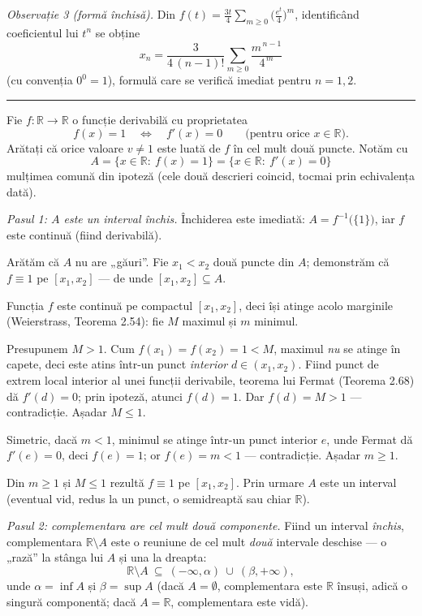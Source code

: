 \emph{Observație 3 (formă închisă).} Din $f(t)=\frac{3t}{4}\sum_{m\ge0}\bigl(\frac{e^{t}}{4}\bigr)^{m}$, identificând coeficientul lui $t^n$ se obține
\[ x_n=\frac{3}{4\,(n-1)!}\sum_{m\ge0}\frac{m^{\,n-1}}{4^{\,m}} \]
(cu convenția $0^0=1$), formulă care se verifică imediat pentru $n=1,2$.
\vspace{1mm}\hrule

Fie $f:\mathbb{R}\to\mathbb{R}$ o funcție derivabilă cu proprietatea
\[ f(x)=1\quad\Longleftrightarrow\quad f'(x)=0\qquad\text{(pentru orice }x\in\mathbb{R}\text{)} . \]
Arătați că orice valoare $v\neq1$ este luată de $f$ în cel mult două puncte.
\sol Notăm cu
\[ A=\{x\in\mathbb{R}:\ f(x)=1\}=\{x\in\mathbb{R}:\ f'(x)=0\} \]
mulțimea comună din ipoteză (cele două descrieri coincid, tocmai prin echivalența dată).

\emph{Pasul 1: $A$ este un interval închis.} Închiderea este imediată: $A=f^{-1}\bigl(\{1\}\bigr)$, iar $f$ este continuă (fiind derivabilă).

Arătăm că $A$ nu are „găuri''. Fie $x_{1}<x_{2}$ două puncte din $A$; demonstrăm că $f\equiv1$ pe $[x_{1},x_{2}]$ --- de unde $[x_{1},x_{2}]\subseteq A$.

Funcția $f$ este continuă pe compactul $[x_{1},x_{2}]$, deci își atinge acolo marginile (Weierstrass, Teorema 2.54): fie $M$ maximul și $m$ minimul.

Presupunem $M>1$. Cum $f(x_{1})=f(x_{2})=1<M$, maximul \emph{nu} se atinge în capete, deci este atins într-un punct \emph{interior} $d\in(x_{1},x_{2})$. Fiind punct de extrem local interior al unei funcții derivabile, teorema lui Fermat (Teorema 2.68) dă $f'(d)=0$; prin ipoteză, atunci $f(d)=1$. Dar $f(d)=M>1$ --- contradicție. Așadar $M\le1$.

Simetric, dacă $m<1$, minimul se atinge într-un punct interior $e$, unde Fermat dă $f'(e)=0$, deci $f(e)=1$; or $f(e)=m<1$ --- contradicție. Așadar $m\ge1$.

Din $m\ge1$ și $M\le1$ rezultă $f\equiv1$ pe $[x_{1},x_{2}]$. Prin urmare $A$ este un interval (eventual vid, redus la un punct, o semidreaptă sau chiar $\mathbb{R}$).

\emph{Pasul 2: complementara are cel mult două componente.} Fiind un interval \emph{închis}, complementara $\mathbb{R}\setminus A$ este o reuniune de cel mult \emph{două} intervale deschise --- o „rază'' la stânga lui $A$ și una la dreapta:
\[ \mathbb{R}\setminus A\ \subseteq\ (-\infty,\alpha)\ \cup\ (\beta,+\infty) , \]
unde $\alpha=\inf A$ și $\beta=\sup A$ (dacă $A=\emptyset$, complementara este $\mathbb{R}$ însuși, adică o singură componentă; dacă $A=\mathbb{R}$, complementara este vidă).

